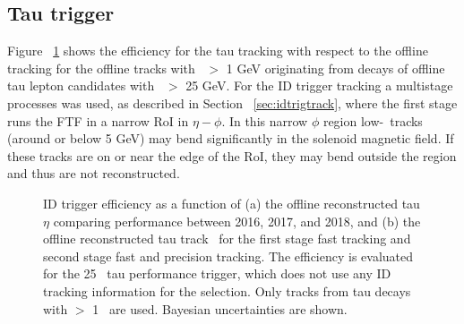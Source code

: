 		\subsection*{Tau trigger}
	\noindent Figure ~\ref{fig:tau_idtrig_eff} shows the efficiency for the tau tracking with respect to the offline tracking for the offline tracks with \pt\ $>$ 1 GeV originating from decays of offline tau lepton candidates with \pt\ $>$ 25 GeV.		
		For the ID trigger tracking a multistage processes was used, as described in Section ~\ref{sec:idtrigtrack}, where the first stage runs the \ac{FTF} in a narrow \ac{RoI} in $\eta-\phi$. In this narrow $\phi$ region low-\pt\ tracks (around or below 5 GeV) may bend significantly in the solenoid magnetic field. If these tracks are on or near the edge of the \ac{RoI}, they may bend outside the region and thus are not reconstructed. 
		\begin{figure}[!htb]
	\begin{center}
		\hspace{0.03\textwidth}
			\hspace{0.03\textwidth}
	\end{center}	
	\caption{\ac{ID} trigger efficiency as a function of (a) the offline reconstructed tau $\eta$ comparing performance between 2016, 2017, and 2018, and (b) the offline reconstructed tau track \pt\ for the first stage fast tracking and second stage fast and precision tracking. The efficiency is evaluated for the 25 \gev\ tau performance trigger, which does not use any ID tracking information for the selection. Only tracks from tau decays with \pt $>$ 1 \gev\ are used. Bayesian uncertainties are shown.}
	\label{fig:tau_idtrig_eff}
	\end{figure}	
	
